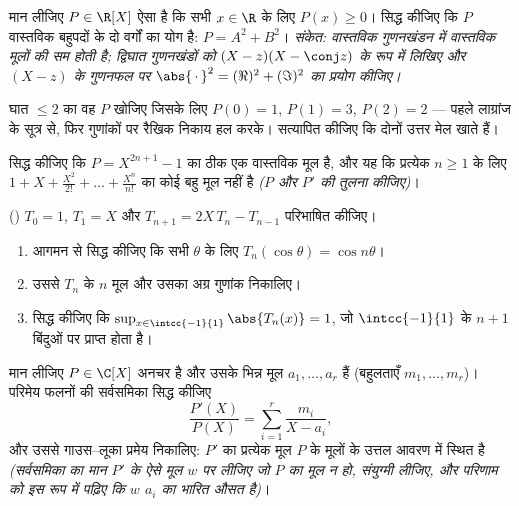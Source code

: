 \begin{exercise}[$\star\star$]\label{exo:b1:poly:7}
मान लीजिए $P \in \R[X]$ ऐसा है कि सभी $x \in \R$ के लिए $P(x) \geq 0$। सिद्ध
कीजिए कि $P$ वास्तविक बहुपदों के दो वर्गों का योग है: $P = A^2 + B^2$।
\emph{संकेत: वास्तविक गुणनखंडन में वास्तविक मूलों की  सम होती है;
द्विघात गुणनखंडों को $(X - z)(X - \conj z)$ के रूप में लिखिए और $(X - z)$ के
गुणनफल पर $\abs{\,\cdot\,}^2 = (\Re)^2 + (\Im)^2$ का प्रयोग कीजिए।}
\end{exercise}

\begin{exercise}[$\star\star$]\label{exo:b1:poly:8}
घात $\leq 2$ का वह  $P$ खोजिए जिसके लिए $P(0) = 1$, $P(1) = 3$, $P(2) =
2$ --- पहले लाग्रांज के सूत्र से, फिर गुणांकों पर रैखिक निकाय हल करके।
सत्यापित कीजिए कि दोनों उत्तर मेल खाते हैं।
\end{exercise}

\begin{exercise}[$\star\star$]\label{exo:b1:poly:9}
सिद्ध कीजिए कि $P = X^{2n+1} - 1$ का ठीक एक वास्तविक मूल है, और यह कि
प्रत्येक $n \geq 1$ के लिए  $1 + X + \frac{X^2}{2!} + \dots +
\frac{X^n}{n!}$ का कोई बहु मूल नहीं है \emph{($P$ और $P'$ की तुलना कीजिए)}।
\end{exercise}

\begin{exercise}[$\star\star\star$]\label{exo:b1:poly:10}
() $T_0 = 1$, $T_1 = X$ और $T_{n+1} = 2X\,T_n - T_{n-1}$
परिभाषित कीजिए।
\begin{enumerate}
  \item आगमन से सिद्ध कीजिए कि सभी $\theta$ के लिए $T_n(\cos\theta) = \cos
  n\theta$।
  \item उससे $T_n$ के $n$ मूल और उसका अग्र गुणांक निकालिए।
  \item सिद्ध कीजिए कि $\sup_{x \in \intcc{-1}{1}} \abs{T_n(x)} = 1$, जो
  $\intcc{-1}{1}$ के $n + 1$ बिंदुओं पर प्राप्त होता है।
\end{enumerate}
\end{exercise}

\begin{exercise}[$\star\star\star$]\label{exo:b1:poly:11}
मान लीजिए $P \in \C[X]$ अनचर है और उसके भिन्न मूल $a_1, \dots, a_r$ हैं
(बहुलताएँ $m_1, \dots, m_r$)। परिमेय फलनों की सर्वसमिका सिद्ध कीजिए
\[
\frac{P'(X)}{P(X)} = \sum_{i=1}^{r} \frac{m_i}{X - a_i},
\]
और उससे गाउस--लूका प्रमेय निकालिए: $P'$ का प्रत्येक मूल $P$ के मूलों के
उत्तल आवरण में स्थित है \emph{(सर्वसमिका का मान $P'$ के ऐसे मूल $w$ पर लीजिए
जो $P$ का मूल न हो, संयुग्मी लीजिए, और परिणाम को इस रूप में पढ़िए कि $w$
$a_i$ का भारित औसत है)}।
\end{exercise}

